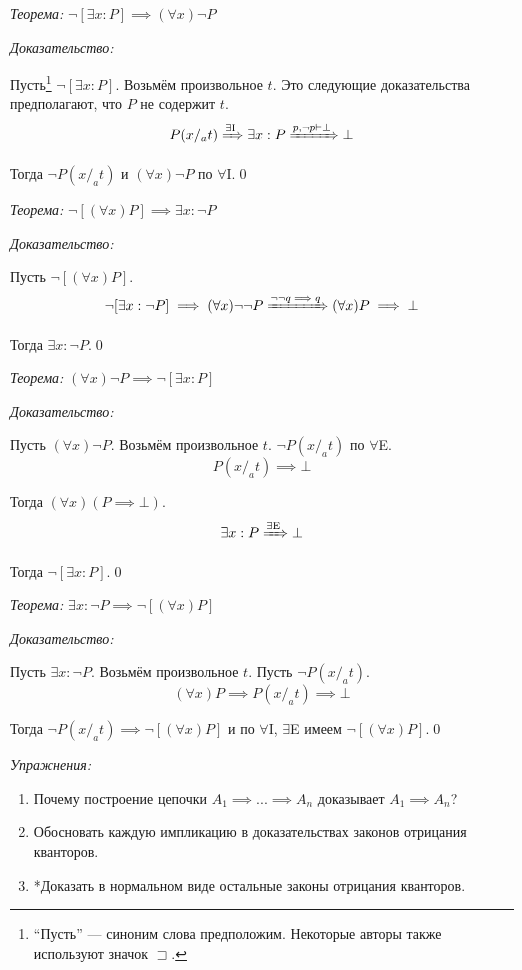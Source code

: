 {\it Теорема:} $\lnot[\exists x:P]\implies (\forall x)\lnot P$

{\it Доказательство:}

Пусть\footnote{
	``Пусть'' --- синоним слова предположим. Некоторые авторы также
	используют значок $\sqsupset$.
} $\lnot[\exists x:P]$. Возьмём произвольное $t$. Это следующие доказательства
предполагают, что $P$ не содержит $t$.
\[
	P(x/_{a}t)\xRightarrow{\text{$\exists$I}} \exists x:P
	\xRightarrow{p,\lnot p\vdash\bot} \bot
\]

Тогда $\lnot P(x/_{a}t)$ и $(\forall x)\lnot P$
по $\forall$I.\qed

\vspace{1em}
{\it Теорема:} $\lnot[(\forall x)P]\implies \exists x:\lnot P$

{\it Доказательство:}

Пусть $\lnot[(\forall x)P]$.
\[
	\lnot[\exists x:\lnot P]\implies (\forall x)\lnot\lnot P
	\xRightarrow{\lnot\lnot q\implies q} (\forall x)P\implies\bot
\]

Тогда $\exists x:\lnot P$.\qed

\pagebreak

{\it Теорема:} $(\forall x)\lnot P\implies \lnot[\exists x:P]$

{\it Доказательство:}

Пусть $(\forall x)\lnot P$. Возьмём произвольное $t$. $\lnot P(x/_{a}t)$ по $\forall$E.
\[
	P(x/_{a}t)\implies \bot
\]

Тогда $(\forall x)(P\implies \bot)$.
\[
	\exists x:P\xRightarrow{\text{$\exists$E}} \bot
\]

Тогда $\lnot[\exists x:P]$.\qed

\vspace{1em}
{\it Теорема:} $\exists x:\lnot P\implies\lnot[(\forall x)P]$

{\it Доказательство:}

Пусть $\exists x:\lnot P$. Возьмём произвольное $t$. Пусть $\lnot P(x/_{a}t)$.
\[
	(\forall x)P\implies P(x/_{a}t)\implies \bot
\]

Тогда ${\lnot P(x/_{a}t)\implies \lnot[(\forall x)P]}$ и по $\forall$I, $\exists$E
имеем $\lnot[(\forall x)P]$.\qed

\vspace{1em}
{\it Упражнения:}
\begin{enumerate}
	\item{}Почему построение цепочки $A_1\implies...\implies A_{n}$
	доказывает $A_1\implies A_{n}$?
	\item{}Обосновать каждую импликацию в доказательствах законов отрицания кванторов.
	\item{}*Доказать в нормальном виде остальные законы отрицания кванторов.
\end{enumerate}

\pagebreak
